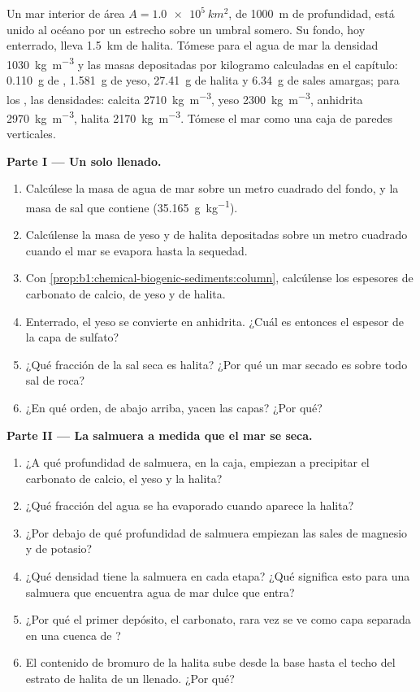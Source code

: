 \begin{problem}
\label{pb:b1:chemical-biogenic-sediments:1}
Un mar interior de área $A = \qty{1.0e5}{km^2}$, de \qty{1000}{m} de profundidad, está unido al océano por un estrecho sobre un umbral somero. Su fondo, hoy enterrado, lleva \qty{1.5}{km} de halita.
Tómese para el agua de mar la densidad \qty{1030}{kg.m^{-3}} y las masas depositadas por kilogramo calculadas en el capítulo: \qty{0.110}{g} de , \qty{1.581}{g} de yeso,
\qty{27.41}{g} de halita y \qty{6.34}{g} de sales amargas; para los , las densidades: calcita \qty{2710}{kg.m^{-3}}, yeso \qty{2300}{kg.m^{-3}}, anhidrita
\qty{2970}{kg.m^{-3}}, halita \qty{2170}{kg.m^{-3}}. Tómese el mar como una caja de paredes verticales.

\medskip
\noindent\textbf{Parte I --- Un solo llenado.}
\begin{enumerate}
  \item Calcúlese la masa de agua de mar sobre un metro cuadrado del fondo, y la masa de sal que contiene (\qty{35.165}{g.kg^{-1}}).
  \item Calcúlense la masa de yeso y de halita depositadas sobre un metro cuadrado cuando el mar se evapora hasta la sequedad.
  \item Con \cref{prop:b1:chemical-biogenic-sediments:column}, calcúlense los espesores de carbonato de calcio, de yeso y de halita.
  \item Enterrado, el yeso se convierte en anhidrita. ¿Cuál es entonces el espesor de la capa de sulfato?
  \item ¿Qué fracción de la sal seca es halita? ¿Por qué un mar secado es sobre todo sal de roca?
  \item ¿En qué orden, de abajo arriba, yacen las capas? ¿Por qué?
\end{enumerate}

\noindent\textbf{Parte II --- La salmuera a medida que el mar se seca.}
\begin{enumerate}[resume]
  \item ¿A qué profundidad de salmuera, en la caja, empiezan a precipitar el carbonato de calcio, el yeso y la halita?
  \item ¿Qué fracción del agua se ha evaporado cuando aparece la halita?
  \item ¿Por debajo de qué profundidad de salmuera empiezan las sales de magnesio y de potasio?
  \item ¿Qué densidad tiene la salmuera en cada etapa? ¿Qué significa esto para una salmuera que encuentra agua de mar dulce que entra?
  \item ¿Por qué el primer depósito, el carbonato, rara vez se ve como capa separada en una cuenca de ?
  \item El contenido de bromuro de la halita sube desde la base hasta el techo del estrato de halita de un llenado. ¿Por qué?
\end{enumerate}


\end{problem}
